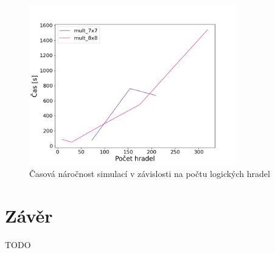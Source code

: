 \begin{figure}[H]
    \centering
    \includegraphics[width=0.8\textwidth]{obrazky-figures/scalability_time.png}
    \caption{Časová náročnost simulací v závislosti na počtu logických hradel}
    \label{fig:scalability_time}
\end{figure}

\chapter{Závěr}
\label{zaver}
TODO


%

